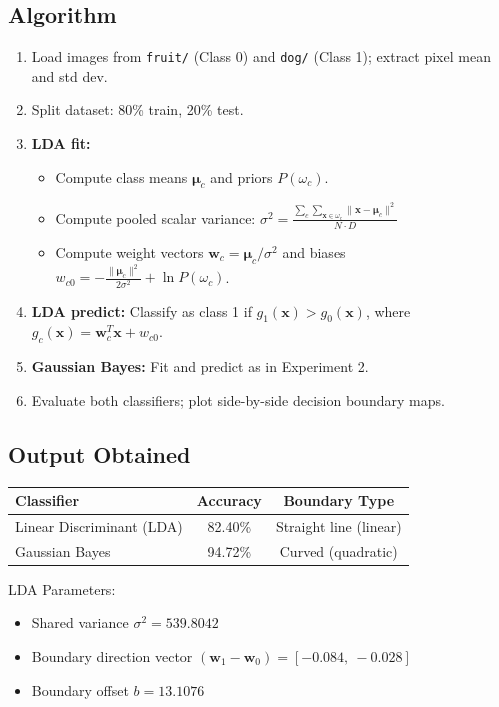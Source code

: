 \documentclass[12pt,a4paper]{article}
\begin{document}
\subsection*{Algorithm}
\begin{enumerate}[leftmargin=*, label=\arabic*.]
  \item Load images from \texttt{fruit/} (Class 0) and \texttt{dog/} (Class 1); extract pixel mean and std dev.
  \item Split dataset: 80\% train, 20\% test.
  \item \textbf{LDA fit:}
    \begin{itemize}
      \item Compute class means $\boldsymbol{\mu}_c$ and priors $P(\omega_c)$.
      \item Compute pooled scalar variance: $\sigma^2 = \frac{\sum_c \sum_{\mathbf{x} \in \omega_c} \|\mathbf{x}-\boldsymbol{\mu}_c\|^2}{N \cdot D}$
      \item Compute weight vectors $\mathbf{w}_c = \boldsymbol{\mu}_c / \sigma^2$ and biases $w_{c0} = -\frac{\|\boldsymbol{\mu}_c\|^2}{2\sigma^2} + \ln P(\omega_c)$.
    \end{itemize}
  \item \textbf{LDA predict:} Classify as class 1 if $g_1(\mathbf{x}) > g_0(\mathbf{x})$, where $g_c(\mathbf{x}) = \mathbf{w}_c^T\mathbf{x} + w_{c0}$.
  \item \textbf{Gaussian Bayes:} Fit and predict as in Experiment 2.
  \item Evaluate both classifiers; plot side-by-side decision boundary maps.
\end{enumerate}

\subsection*{Output Obtained}

\begin{center}
\begin{tabular}{lcc}
\toprule
\textbf{Classifier} & \textbf{Accuracy} & \textbf{Boundary Type} \\
\midrule
Linear Discriminant (LDA) & 82.40\% & Straight line (linear) \\
Gaussian Bayes            & 94.72\% & Curved (quadratic)     \\
\bottomrule
\end{tabular}
\end{center}

\noindent LDA Parameters:
\begin{itemize}
  \item Shared variance $\sigma^2 = 539.8042$
  \item Boundary direction vector $(\mathbf{w}_1 - \mathbf{w}_0) = [-0.084,\ -0.028]$
  \item Boundary offset $b = 13.1076$
\end{itemize}
\end{document}
